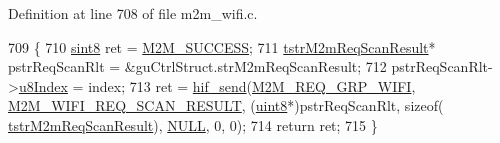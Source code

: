 Definition at line 708 of file m2m\+\_\+wifi.\+c.


\begin{DoxyCode}
709 \{
710     \hyperlink{group__DataT_gae35f10ffd0ac8dd2bc3e794da9bdfbc7}{sint8} ret = \hyperlink{nm__common_8h_a9ef27ba27aafdd1aa3a79d3ba2c36b8f}{M2M\_SUCCESS};
711     \hyperlink{structtstrM2mReqScanResult}{tstrM2mReqScanResult}* pstrReqScanRlt = &guCtrlStruct.strM2mReqScanResult;
712     pstrReqScanRlt->\hyperlink{structtstrM2mReqScanResult_a7f09d082424b29064faa67a51a633853}{u8Index} = index;
713     ret = \hyperlink{m2m__hif_8c_a13ba8ad11b2ac39516ca787386d16ce0}{hif\_send}(\hyperlink{nm__common_8h_a9ab02eb1aea02a75c3f5aade4eef1276aeb9a7d57324ba4b8a6c2a5f46dd499c2}{M2M\_REQ\_GRP\_WIFI}, 
      \hyperlink{group__WlanEnums_gga064de09dec1d5e88ed8d075fa40f57dea200a79b0551b5671e3b4a5bbfeab18ed}{M2M\_WIFI\_REQ\_SCAN\_RESULT}, (\hyperlink{group__DataT_ga4df709a77647e870bbf1d955b8edc9a6}{uint8}*)pstrReqScanRlt, \textcolor{keyword}{sizeof}(
      \hyperlink{structtstrM2mReqScanResult}{tstrM2mReqScanResult}), \hyperlink{group__BSPDefine_ga070d2ce7b6bb7e5c05602aa8c308d0c4}{NULL}, 0, 0);
714     \textcolor{keywordflow}{return} ret;
715 \}
\end{DoxyCode}
